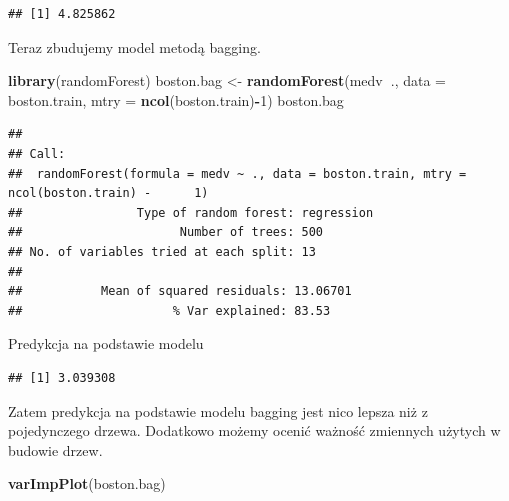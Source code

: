 \documentclass[]{book}
\newenvironment{Shaded}{\begin{snugshade}}{\end{snugshade}}
\newcommand{\DataTypeTok}[1]{\textcolor[rgb]{0.13,0.29,0.53}{#1}}
\newcommand{\DecValTok}[1]{\textcolor[rgb]{0.00,0.00,0.81}{#1}}
\newcommand{\KeywordTok}[1]{\textcolor[rgb]{0.13,0.29,0.53}{\textbf{#1}}}
\newcommand{\NormalTok}[1]{#1}
\newcommand{\OperatorTok}[1]{\textcolor[rgb]{0.81,0.36,0.00}{\textbf{#1}}}
\newcommand{\StringTok}[1]{\textcolor[rgb]{0.31,0.60,0.02}{#1}}
\theoremstyle{plain}
\theoremstyle{definition}
\theoremstyle{definition}
\theoremstyle{definition}
\theoremstyle{definition}
\theoremstyle{remark}
\begin{document}
\begin{verbatim}
## [1] 4.825862
\end{verbatim}

Teraz zbudujemy model metodą bagging.

\begin{Shaded}
\begin{Highlighting}[]
\KeywordTok{library}\NormalTok{(randomForest)}
\NormalTok{boston.bag <-}\StringTok{ }\KeywordTok{randomForest}\NormalTok{(medv}\OperatorTok{~}\NormalTok{., }\DataTypeTok{data =}\NormalTok{ boston.train, }
                           \DataTypeTok{mtry =} \KeywordTok{ncol}\NormalTok{(boston.train)}\OperatorTok{-}\DecValTok{1}\NormalTok{)}
\NormalTok{boston.bag}
\end{Highlighting}
\end{Shaded}

\begin{verbatim}
## 
## Call:
##  randomForest(formula = medv ~ ., data = boston.train, mtry = ncol(boston.train) -      1) 
##                Type of random forest: regression
##                      Number of trees: 500
## No. of variables tried at each split: 13
## 
##           Mean of squared residuals: 13.06701
##                     % Var explained: 83.53
\end{verbatim}

Predykcja na podstawie modelu

\begin{Shaded}
\end{Shaded}

\begin{verbatim}
## [1] 3.039308
\end{verbatim}

Zatem predykcja na podstawie modelu bagging jest nico lepsza niż z pojedynczego drzewa. Dodatkowo możemy ocenić ważność zmiennych użytych w budowie drzew.

\begin{Shaded}
\begin{Highlighting}[]
\KeywordTok{varImpPlot}\NormalTok{(boston.bag)}
\end{Highlighting}
\end{Shaded}
\end{document}
